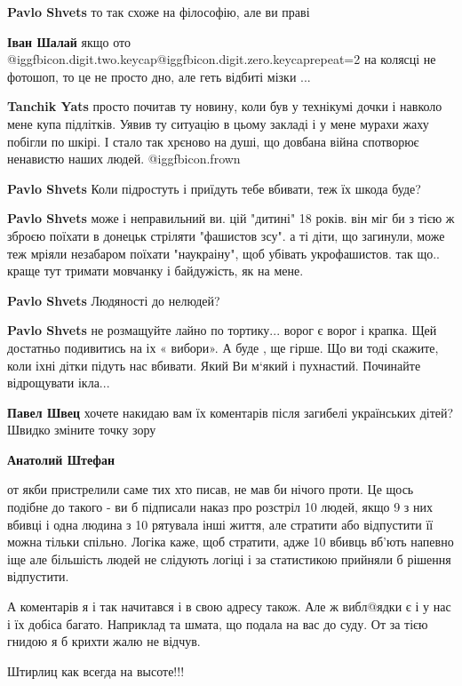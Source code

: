 \begin{itemize}
\begin{itemize}
\textbf{Pavlo Shvets} то так схоже на філософію, але ви праві

\textbf{Іван Шалай} якщо ото @igg{fbicon.digit.two.keycap}@igg{fbicon.digit.zero.keycap}{repeat=2} на колясці не фотошоп, то це не просто дно, але геть відбиті мізки ...

\textbf{Tanchik Yats} просто почитав ту новину, коли був у технікумі дочки і навколо мене купа підлітків. Уявив ту ситуацію в цьому закладі і у мене мурахи жаху побігли по шкірі. І стало так хрєново на душі, що довбана війна спотворює ненавистю наших людей.  @igg{fbicon.frown} 

\textbf{Pavlo Shvets} Коли підростуть і приїдуть тебе вбивати, теж їх шкода буде?

\textbf{Pavlo Shvets} може і неправильний ви. цій "дитині" 18 років. він міг би з тією ж зброєю поїхати в донецьк стріляти "фашистов зсу". а ті діти, що загинули, може теж мріяли незабаром поїхати "наукраіну", щоб убівать укрофашистов. так що.. краще тут тримати мовчанку і байдужість, як на мене.

\textbf{Pavlo Shvets} Людяності до нелюдей?

\textbf{Pavlo Shvets} не розмащуйте лайно по тортику... ворог є ворог і крапка. Щей достатньо подивитись на іх « вибори». А буде , ще гірше. Що ви тоді скажите, коли іхні дітки підуть нас вбивати. Який Ви м‘який і пухнастий. Починайте відрощувати ікла...

\textbf{Павел Швец} хочете накидаю вам їх коментарів після загибелі українських дітей? Швидко зміните точку зору

\textbf{Анатолий Штефан} 

от якби пристрелили саме тих хто писав, не мав би нічого проти. Це щось подібне
до такого - ви б підписали наказ про розстріл 10 людей, якщо 9 з них вбивці і
одна людина з 10 рятувала інші життя, але стратити або відпустити її можна
тільки спільно. Логіка каже, щоб стратити, адже 10 вбивць вб'ють напевно іще
але більшість людей не слідують логіці і за статистикою прийняли б рішення
відпустити.

А коментарів я і так начитався і в свою адресу також. Але ж вибл@ядки є і у нас
і їх добіса багато. Наприклад та шмата, що подала на вас до суду. От за тією
гнидою я б крихти жалю не відчув.


Штирлиц как всегда на высоте!!!


\end{itemize}
\end{itemize}
